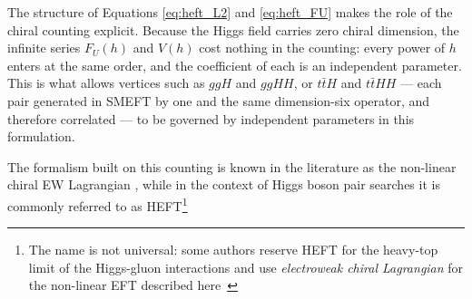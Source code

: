 The structure of Equations \ref{eq:heft_L2} and \ref{eq:heft_FU} makes the role of the chiral counting explicit. Because the Higgs field carries zero chiral dimension, the infinite series $F_U(h)$ and $V(h)$ cost nothing in the counting: every power of $h$ enters at the same order, and the coefficient of each is an independent parameter. This is what allows vertices such as $ggH$ and $ggHH$, or $t\bar{t}H$ and $t\bar{t}HH$ — each pair generated in SMEFT by one and the same dimension-six operator, and therefore correlated — to be governed by independent parameters in this formulation.

The formalism built on this counting is known in the literature as the non-linear chiral EW Lagrangian \cite{Feruglio:1992wf,Burgess:1999ha,Grinstein:2007iv,Contino:2010mh,Alonso:2012px,Buchalla:2013rka}, while in the context of Higgs boson pair searches it is commonly referred to as HEFT\footnote{The name is not universal: some authors reserve HEFT for the heavy-top limit of the Higgs-gluon interactions and use \textit{electroweak chiral Lagrangian} for the non-linear EFT described here~\cite{Buchalla:2018yce}}




